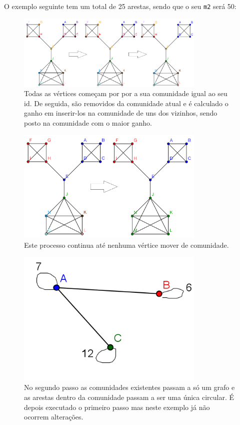 O exemplo seguinte tem um total de 25 arestas, sendo que o seu \verb|m2| será 50:
\begin{figure}
\includegraphics[width=90mm]{graphf1}
\caption{Todas as vértices começam por por a sua comunidade igual ao seu id. De seguida, são removidos da comunidade atual e é calculado o ganho em inserir-los na comunidade de uns dos vizinhos, sendo posto na comunidade com o maior ganho.}
\end{figure}
\begin{figure}
\includegraphics[width=90mm]{graphf2}
\caption{Este processo continua até nenhuma vértice mover de comunidade.}
\end{figure}
\begin{figure}
\includegraphics[width=90mm]{graphf3}
\caption{No segundo passo as comunidades existentes passam a só um grafo e as arestas dentro da comunidade passam a ser uma única circular. É depois executado o primeiro passo mas neste exemplo já não ocorrem alterações.}
\end{figure}


